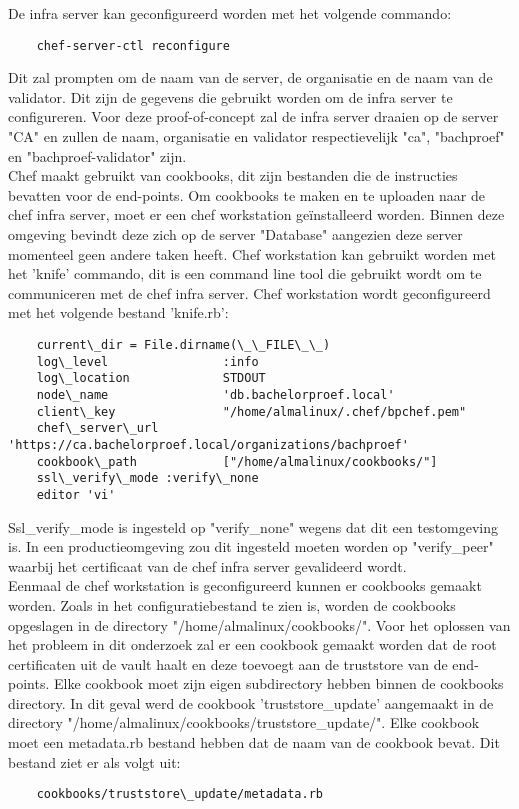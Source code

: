De infra server kan geconfigureerd worden met het volgende commando:
\begin{verbatim}
    chef-server-ctl reconfigure
\end{verbatim}

Dit zal prompten om de naam van de server, de organisatie en de naam van de validator. Dit zijn de gegevens die gebruikt worden om de infra server te configureren.
Voor deze proof-of-concept zal de infra server draaien op de server "CA" en zullen de naam, organisatie en validator respectievelijk "ca", "bachproef" en "bachproef-validator" zijn. \\

Chef maakt gebruikt van cookbooks, dit zijn bestanden die de instructies bevatten voor de end-points. 
Om cookbooks te maken en te uploaden naar de chef infra server, moet er een chef workstation geïnstalleerd worden. Binnen deze omgeving bevindt deze zich op de server "Database" aangezien deze server momenteel geen andere taken heeft.
Chef workstation kan gebruikt worden met het 'knife' commando, dit is een command line tool die gebruikt wordt om te communiceren met de chef infra server.
Chef workstation wordt geconfigureerd met het volgende bestand 'knife.rb':
\begin{verbatim}
    current\_dir = File.dirname(\_\_FILE\_\_)
    log\_level                :info
    log\_location             STDOUT
    node\_name                'db.bachelorproef.local'
    client\_key               "/home/almalinux/.chef/bpchef.pem"
    chef\_server\_url          'https://ca.bachelorproef.local/organizations/bachproef'
    cookbook\_path            ["/home/almalinux/cookbooks/"]
    ssl\_verify\_mode :verify\_none
    editor 'vi'
\end{verbatim}

Ssl\_verify\_mode is ingesteld op "verify\_none" wegens dat dit een testomgeving is. In een productieomgeving zou dit ingesteld moeten worden op "verify\_peer" waarbij het certificaat van de chef infra server gevalideerd wordt. \\
Eenmaal de chef workstation is geconfigureerd kunnen er cookbooks gemaakt worden. Zoals in het configuratiebestand te zien is, worden de cookbooks opgeslagen in de directory "/home/almalinux/cookbooks/".
Voor het oplossen van het probleem in dit onderzoek zal er een cookbook gemaakt worden dat de root certificaten uit de vault haalt en deze toevoegt aan de truststore van de end-points. Elke cookbook moet zijn eigen subdirectory hebben binnen de cookbooks directory.
In dit geval werd de cookbook 'truststore\_update' aangemaakt in de directory "/home/almalinux/cookbooks/truststore\_update/". Elke cookbook moet een metadata.rb bestand hebben dat de naam van de cookbook bevat. Dit bestand ziet er als volgt uit:
\begin{verbatim}
    cookbooks/truststore\_update/metadata.rb
\end{verbatim}

